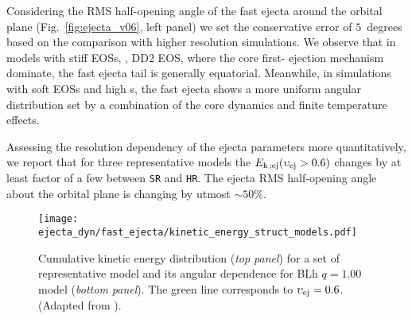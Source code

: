 Considering the \ac{RMS} half-opening angle of the fast ejecta around the 
orbital plane (Fig.~\ref{fig:ejecta_v06}, left panel) we set the conservative 
error of $5$~degrees based on the comparison with higher resolution
simulations. 
%
%
We observe that in models with stiff \acp{EOS}, \eg, DD2 \ac{EOS}, where the 
core first-\bnc{} ejection mechanism dominate, the fast ejecta tail is generally equatorial.
Meanwhile, in simulations with soft \acp{EOS} and high \mr{}s, the fast ejecta shows 
a more uniform angular distribution set by a combination of the core dynamics and 
finite temperature effects.%

Assessing the resolution dependency of the ejecta parameters more quantitatively,
we report that for three representative models 
the $E_{\rm k \,; ej}(\upsilon_{\text{ej}} > 0.6)$ changes
by at least factor of a few
between \texttt{SR} and \texttt{HR}. 
The ejecta \ac{RMS} half-opening angle about the 
orbital plane is changing by utmost ${\sim}50\%$.

\begin{figure}%
    \centering 
    \texttt{[image: ejecta\_dyn/fast\_ejecta/kinetic\_energy\_struct\_models.pdf]}
    \caption{
        Cumulative kinetic energy distribution (\textit{top panel}) for a set of 
        representative model and its angular dependence 
        for BLh $q=1.00$ model (\textit{bottom panel}). 
        The green line corresponds to $\upsilon_{\rm ej}=0.6$. 
        (Adapted from \citet{Nedora:2021eoj}). 
    } 
    \label{fig:ejecta_vel_hist}
\end{figure}


